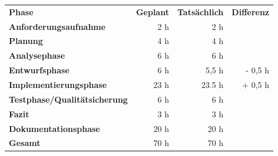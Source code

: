 \begin{tabu}{lrrr}
\rowfont{\bfseries\leavevmode\color{headingfont}}\textbf{Phase} & \textbf{Geplant} & \textbf{Tatsächlich} & \textbf{Differenz} \\
\textbf{Anforderungsaufnahme} & 2 h & 2 h & \\
\textbf{Planung} & 4 h & 4 h & \\ 
\textbf{Analysephase} & 6 h & 6 h  &  \\
\textbf{Entwurfsphase} & 6 h & 5,5 h & - 0,5 h \\
\textbf{Implementierungsphase} & 23 h  & 23.5 h  & + 0,5 h \\
\textbf{Testphase/Qualitätsicherung} & 6 h & 6 h & \\
\textbf{Fazit} & 3 h & 3 h & \\
\textbf{Dokumentationsphase} & 20 h & 20 h & \\
\hline
\hline
{}\textbf{Gesamt} & 70 h & 70 h & \\
\end{tabu}
